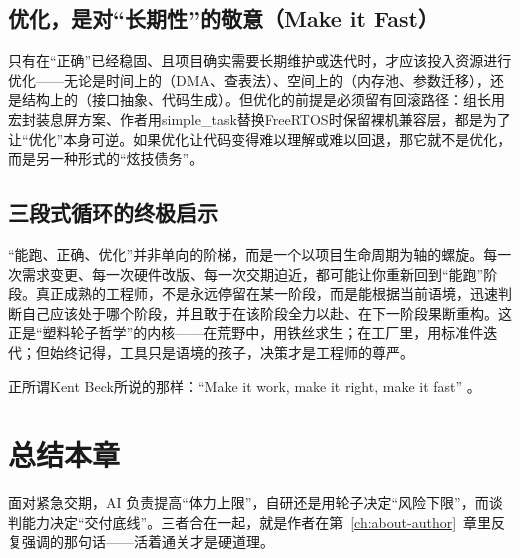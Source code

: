 \subsection{优化，是对“长期性”的敬意（Make it Fast）}
只有在“正确”已经稳固、且项目确实需要长期维护或迭代时，才应该投入资源进行优化——无论是时间上的（DMA、查表法）、空间上的（内存池、参数迁移），还是结构上的（接口抽象、代码生成）。但优化的前提是必须留有回滚路径：组长用宏封装息屏方案、作者用simple\_task替换FreeRTOS时保留裸机兼容层，都是为了让“优化”本身可逆。如果优化让代码变得难以理解或难以回退，那它就不是优化，而是另一种形式的“炫技债务”。

\subsection{三段式循环的终极启示}
“能跑、正确、优化”并非单向的阶梯，而是一个以项目生命周期为轴的螺旋。每一次需求变更、每一次硬件改版、每一次交期迫近，都可能让你重新回到“能跑”阶段。真正成熟的工程师，不是永远停留在某一阶段，而是能根据当前语境，迅速判断自己应该处于哪个阶段，并且敢于在该阶段全力以赴、在下一阶段果断重构。这正是“塑料轮子哲学”的内核——在荒野中，用铁丝求生；在工厂里，用标准件迭代；但始终记得，工具只是语境的孩子，决策才是工程师的尊严。

正所谓Kent Beck所说的那样：“Make it work, make it right, make it fast” 。


\section{总结本章}
面对紧急交期，AI 负责提高“体力上限”，自研还是用轮子决定“风险下限”，而谈判能力决定“交付底线”。三者合在一起，就是作者在第~\ref{ch:about-author}~章里反复强调的那句话——活着通关才是硬道理。
